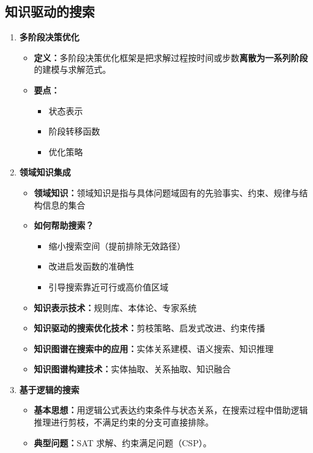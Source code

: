 \documentclass[../main.tex]{subfiles}
\begin{document}
\subsection{知识驱动的搜索}\label{sec:knowledge-driven-search}
\begin{enumerate}
    \item \textbf{多阶段决策优化}
    \begin{itemize}
        \item \textbf{定义：}多阶段决策优化框架是把求解过程按时间或步数\textbf{离散为一系列阶段}的建模与求解范式。
        \item \textbf{要点：}
        \begin{itemize}
            \item 状态表示
            \item 阶段转移函数
            \item 优化策略
        \end{itemize}
    \end{itemize}
    \item \textbf{领域知识集成}
    \begin{itemize}
        \item \textbf{领域知识：}领域知识是指与具体问题域固有的先验事实、约束、规律与结构信息的集合
        \item \textbf{如何帮助搜索？}
        \begin{itemize}
            \item 缩小搜索空间（提前排除无效路径）
            \item 改进启发函数的准确性
            \item 引导搜索靠近可行或高价值区域
        \end{itemize}
        \item \textbf{知识表示技术：}规则库、本体论、专家系统
        \item \textbf{知识驱动的搜索优化技术：}剪枝策略、启发式改进、约束传播  
        \item \textbf{知识图谱在搜索中的应用：}实体关系建模、语义搜索、知识推理
        \item \textbf{知识图谱构建技术：}实体抽取、关系抽取、知识融合
    \end{itemize}
    \item \textbf{基于逻辑的搜索}
    \begin{itemize}
        \item \textbf{基本思想：}用逻辑公式表达约束条件与状态关系，在搜索过程中借助逻辑推理进行剪枝，不满足约束的分支可直接排除。
        \item \textbf{典型问题：}SAT 求解、约束满足问题（CSP）。
        

\end{itemize}
\end{enumerate}
\end{document}
